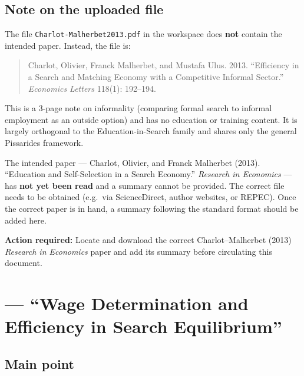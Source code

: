\documentclass[12pt]{article}
\begin{document}
\subsection*{Note on the uploaded file}

The file \texttt{Charlot-Malherbet2013.pdf} in the workspace does \textbf{not} contain the intended paper. Instead, the file is:

\begin{quote}
Charlot, Olivier, Franck Malherbet, and Mustafa Ulus. 2013. ``Efficiency in a Search and Matching Economy with a Competitive Informal Sector.'' \emph{Economics Letters} 118(1): 192--194.
\end{quote}

This is a 3-page note on informality (comparing formal search to informal employment as an outside option) and has no education or training content. It is largely orthogonal to the Education-in-Search family and shares only the general Pissarides framework.

\medskip

The intended paper --- Charlot, Olivier, and Franck Malherbet (2013). ``Education and Self-Selection in a Search Economy.'' \emph{Research in Economics} --- has \textbf{not yet been read} and a summary cannot be provided. The correct file needs to be obtained (e.g.\ via ScienceDirect, author websites, or REPEC). Once the correct paper is in hand, a summary following the standard format should be added here.

\medskip

\noindent\textbf{Action required:} Locate and download the correct Charlot--Malherbet (2013) \emph{Research in Economics} paper and add its summary before circulating this document.



\section{\citet{diamond1982} --- ``Wage Determination and Efficiency in Search Equilibrium''}

\subsection*{Main point}
\end{document}
